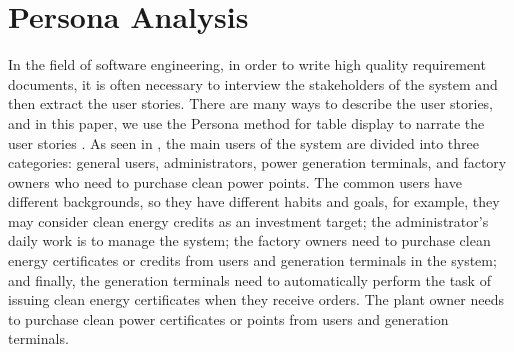 \section{Persona Analysis}
In the field of software engineering, in order to write high quality requirement documents, it is often necessary to interview the stakeholders of the system and then extract the user stories. There are many ways to describe the user stories, and in this paper, we use the Persona method for table display to narrate the user stories \cite{persona}. As seen in , the main users of the system are divided into three categories: general users, administrators, power generation terminals, and factory owners who need to purchase clean power points. The common users have different backgrounds, so they have different habits and goals, for example, they may consider clean energy credits as an investment target; the administrator's daily work is to manage the system; the factory owners need to purchase clean energy certificates or credits from users and generation terminals in the system; and finally, the generation terminals need to automatically perform the task of issuing clean energy certificates when they receive orders. The plant owner needs to purchase clean power certificates or points from users and generation terminals.
